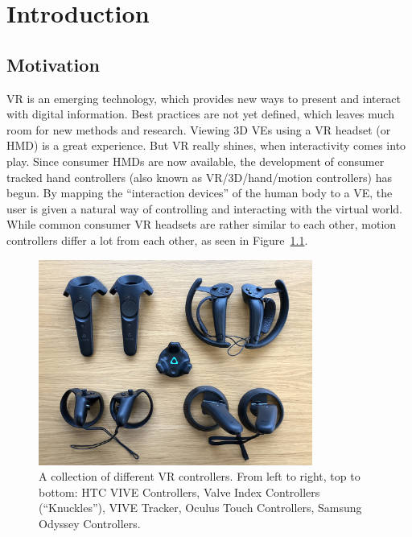 \chapter{Introduction}\label{chapter:introduction}

\section{Motivation}\label{section:motivation}

\begin{sloppypar}%
  \ac{VR} is an emerging technology, which provides new ways to present and interact with digital information. Best practices are not yet defined, which leaves much room for new methods and research. Viewing \ac{3D} \acp{VE} using a \ac{VR} headset (or \ac{HMD}) is a great experience. But \ac{VR} really shines, when interactivity comes into play. Since consumer \acp{HMD} are now available, the development of consumer tracked hand controllers (also known as \ac{VR}/\ac{3D}/hand/motion controllers) has begun. By mapping the \enquote{interaction devices} of the human body to a \ac{VE}, the user is given a natural way of controlling and interacting with the virtual world. While common consumer \ac{VR} headsets are rather similar to each other, motion controllers differ a lot from each other, as seen in Figure~\ref{fig:vr-controllers}.
\end{sloppypar}%

\begin{figure}[H]%
  \centering%
  \includegraphics[width=9cm]{figures/vr_controllers.jpg}%
  \caption[Collection of VR controllers]{A collection of different \ac{VR} controllers. From left to right, top to bottom: HTC VIVE Controllers, Valve Index Controllers (\enquote{Knuckles}), VIVE Tracker, Oculus Touch Controllers, Samsung Odyssey Controllers.}\label{fig:vr-controllers}
\end{figure}


